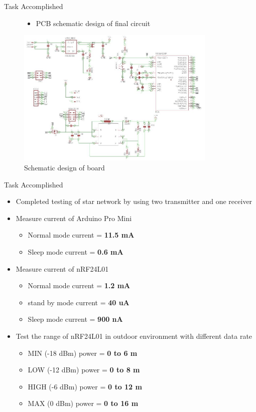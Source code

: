 \documentclass[10pt, a4paper]{beamer}
\begin{document}
\begin{frame}{Task Accomplished}
\begin{figure}
\begin{itemize}
\item PCB schematic design of final circuit
\end{itemize}
\begin{center}
\includegraphics[width=0.85\textwidth]{Capture.JPG}
\caption{Schematic design of board}
\end{center}
\end{figure}
\end{frame}


\begin{frame}{Task Accomplished}
	\begin{itemize}
    \item Completed testing of star network by using two transmitter and one receiver
    \item Measure current of Arduino Pro Mini
    \begin{itemize}
    	\item Normal mode current = \textbf{11.5 mA} 
        \item Sleep mode current = \textbf{0.6 mA}
    \end{itemize}
    \item Measure current of nRF24L01
    \begin{itemize}
    	\item Normal mode current = \textbf{1.2 mA}  
        \item stand by mode current = \textbf{40 uA}
        \item Sleep mode current = \textbf{900 nA}
    \end{itemize}
    \item Test the range of nRF24L01 in outdoor environment with different data rate
    \begin{itemize}
    	\item  MIN (-18 dBm) power = \textbf{0 to 6 m}
        \item  LOW (-12 dBm) power = \textbf{0 to 8 m}
        \item  HIGH (-6 dBm) power = \textbf{0 to 12 m}
        \item  MAX (0 dBm) power = \textbf{0 to 16 m}
	\end{itemize}
    \end{itemize}
\end{frame}
\end{document}
